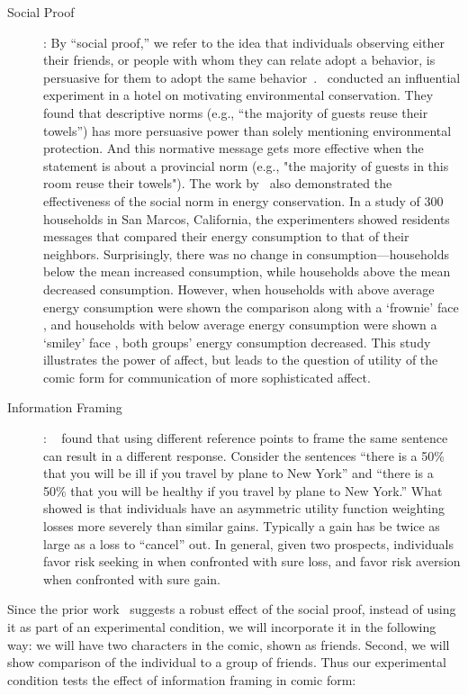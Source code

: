\begin{description}
 \item[Social Proof]: By ``social proof,'' we refer to the idea that individuals observing either their friends, or people with whom they can relate adopt a behavior, is persuasive for them to adopt the same behavior~\cite{Cialdini1993,Cialdini2004}.~\textcite{goldstein2008room} conducted an influential experiment in a hotel on motivating environmental conservation. They found that descriptive norms (e.g., ``the majority of guests reuse their towels'') has more persuasive power than solely mentioning environmental protection. And this normative message gets more effective when the statement is about a provincial norm (e.g., "the majority of guests in this room reuse their towels"). The work by~\textcite{schultz2007constructive} also demonstrated the effectiveness of the social norm in energy conservation. In a study of 300 households in San Marcos, California, the experimenters showed residents messages that compared their energy consumption to that of their neighbors. Surprisingly, there was no change in consumption---households below the mean increased consumption, while households above the mean decreased consumption. However, when households with above average energy consumption were shown the comparison along with a `frownie' face \frownie{}, and households with below average energy consumption were shown a `smiley' face \smiley{}, both groups' energy consumption decreased. This study illustrates the power of affect, but leads to the question of utility of the comic form for communication of more sophisticated affect.
 \item[Information Framing]: ~\textcite{tversky1981framing,tversky1992advances} found that using different reference points to frame the same sentence can result in a different response. Consider the sentences ``there is a 50\% that you will be ill if you travel by plane to New York'' and ``there is a 50\% that you will be healthy if you travel by plane to New York.'' What~\textcite{tversky1981framing} showed is that  individuals have an asymmetric utility function weighting losses more severely than similar gains. Typically a gain has be twice as large as a loss to ``cancel'' out. In general, given two prospects, individuals favor risk seeking in when confronted with sure loss, and favor risk aversion when confronted with sure gain.
\end{description}

Since the prior work~\cite{goldstein2008room,schultz2007constructive} suggests a robust effect of the social proof, instead of using it as part of an experimental condition, we will incorporate it in the following way: we will have two characters in the comic, shown as friends. Second, we will show comparison of the individual to a group of friends. Thus our experimental condition tests the effect of information framing in comic form:

